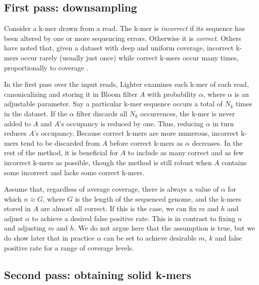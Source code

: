 \documentclass[10pt]{article}
\begin{document}
\subsection*{First pass: downsampling}

Consider a k-mer drawn from a read.  The k-mer is \emph{incorrect} if its sequence has been altered by one or more sequencing errors.  Otherwise it is \emph{correct}.  Others have noted that, given a dataset with deep and uniform coverage, incorrect k-mers occur rarely (usually just once) while correct k-mers occur many times, proportionally to coverage \cite{pevzner2001eulerian, chaisson2004fragment}.

In the first pass over the input reads, Lighter examines each k-mer of each read, canonicalizing and storing it in Bloom filter $A$ with probability $\alpha$, where $\alpha$ is an adjustable parameter.  Say a particular k-mer sequence occurs a total of $N_k$ times in the dataset.  If the $\alpha$ filter discards all $N_k$ occurrences, the k-mer is never added to $A$ and $A$'s occupancy is reduced by one.  Thus, reducing $\alpha$ in turn reduces $A$'s occupancy.  Because correct k-mers are more numerous, incorrect k-mers tend to be discarded from $A$ before correct k-mers as $\alpha$ decreases.  In the rest of the method, it is beneficial for $A$ to include as many correct and as few incorrect k-mers as possible, though the method is still robust when $A$ contains some incorrect and lacks some correct k-mers.

Assume that, regardless of average coverage, there is always a value of $\alpha$ for which $n \approx G$, where $G$ is the length of the sequenced genome, and the k-mers stored in $A$ are almost all correct.  If this is the case, we can fix $m$ and $h$ and adjust $\alpha$ to achieve a desired false positive rate.  This is in contrast to fixing $n$ and adjusting $m$ and $h$.  We do not argue here that the assumption is true, but we do show later that in practice $\alpha$ can be set to achieve desirable $m$, $k$ and false positive rate for a range of coverage levels.


\subsection*{Second pass: obtaining solid k-mers}
\end{document}
